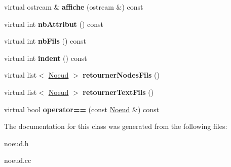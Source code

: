 \begin{DoxyCompactItemize}
\item 
\hypertarget{class_noeud_a6780e6e2b0a251ba12cca49432043bd7}{virtual ostream \& {\bfseries affiche} (ostream \&) const }\label{class_noeud_a6780e6e2b0a251ba12cca49432043bd7}

\item 
\hypertarget{class_noeud_a84fbd72cb471bc239ba6f8333db40a28}{virtual int {\bfseries nb\-Attribut} () const }\label{class_noeud_a84fbd72cb471bc239ba6f8333db40a28}

\item 
\hypertarget{class_noeud_a4e7c9b2370e3cb38eb17d76242ea61ef}{virtual int {\bfseries nb\-Fils} () const }\label{class_noeud_a4e7c9b2370e3cb38eb17d76242ea61ef}

\item 
\hypertarget{class_noeud_a99a1ea747bffbb71d1e503b6c7ab7a2d}{virtual int {\bfseries indent} () const }\label{class_noeud_a99a1ea747bffbb71d1e503b6c7ab7a2d}

\item 
\hypertarget{class_noeud_a35d193d8ac74ec15781500a7efcf2401}{virtual list$<$ \hyperlink{class_noeud}{Noeud} $>$ {\bfseries retourner\-Nodes\-Fils} ()}\label{class_noeud_a35d193d8ac74ec15781500a7efcf2401}

\item 
\hypertarget{class_noeud_a9cff8c418007ae84f96eff320fa5e673}{virtual list$<$ \hyperlink{class_noeud}{Noeud} $>$ {\bfseries retourner\-Text\-Fils} ()}\label{class_noeud_a9cff8c418007ae84f96eff320fa5e673}

\item 
\hypertarget{class_noeud_a5cb2e3351e1e4f73e183c759a6eb3fd1}{virtual bool {\bfseries operator==} (const \hyperlink{class_noeud}{Noeud} \&) const }\label{class_noeud_a5cb2e3351e1e4f73e183c759a6eb3fd1}

\end{DoxyCompactItemize}


The documentation for this class was generated from the following files\-:\begin{DoxyCompactItemize}
\item 
noeud.\-h\item 
noeud.\-cc\end{DoxyCompactItemize}
